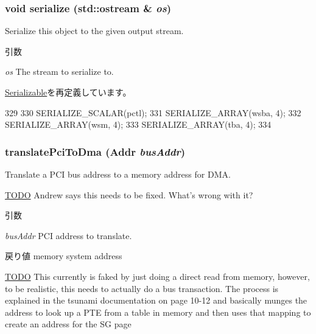 \hypertarget{classTsunamiPChip_a53e036786d17361be4c7320d39c99b84}{
\subsubsection[{serialize}]{\setlength{\rightskip}{0pt plus 5cm}void serialize (std::ostream \& {\em os})}}
\label{classTsunamiPChip_a53e036786d17361be4c7320d39c99b84}
Serialize this object to the given output stream. 
\begin{DoxyParams}{引数}
\item[{\em os}]The stream to serialize to. \end{DoxyParams}


\hyperlink{classSerializable_ad6272f80ae37e8331e3969b3f072a801}{Serializable}を再定義しています。


\begin{DoxyCode}
329 {
330     SERIALIZE_SCALAR(pctl);
331     SERIALIZE_ARRAY(wsba, 4);
332     SERIALIZE_ARRAY(wsm, 4);
333     SERIALIZE_ARRAY(tba, 4);
334 }
\end{DoxyCode}
\hypertarget{classTsunamiPChip_a5de3f8c8c47bf4bb58e072f54f4a7cba}{
\subsubsection[{translatePciToDma}]{ translatePciToDma ({\bf Addr} {\em busAddr})}}
\label{classTsunamiPChip_a5de3f8c8c47bf4bb58e072f54f4a7cba}
Translate a PCI bus address to a memory address for DMA. \begin{Desc}
\item[\hyperlink{todo__todo000051}{TODO}]Andrew says this needs to be fixed. What's wrong with it? \end{Desc}

\begin{DoxyParams}{引数}
\item[{\em busAddr}]PCI address to translate. \end{DoxyParams}
\begin{DoxyReturn}{戻り値}
memory system address 
\end{DoxyReturn}


\begin{Desc}
\item[\hyperlink{todo__todo000050}{TODO}]This currently is faked by just doing a direct read from memory, however, to be realistic, this needs to actually do a bus transaction. The process is explained in the tsunami documentation on page 10-\/12 and basically munges the address to look up a PTE from a table in memory and then uses that mapping to create an address for the SG page \end{Desc}



